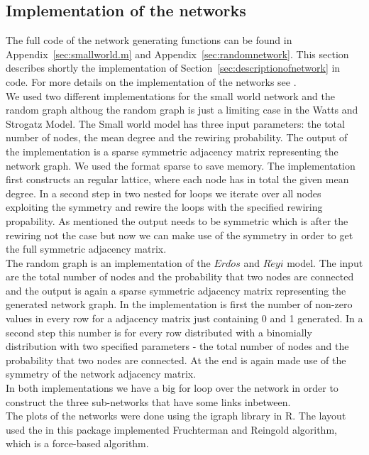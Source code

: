 \subsection{Implementation of the networks}
\label{sec:implementationofnetworks}

The full code of the network generating functions can be found in
Appendix~\ref{sec:smallworld.m} and Appendix~\ref{sec:randomnetwork}. This section describes shortly the implementation of Section~\ref{sec:descriptionofnetwork} in \matlab code. For more details on the implementation of the networks see \cite{BruggerSchwirzer2011}.\\

We used two different implementations for the small world network and the random graph althoug the random graph is just a limiting case in the Watts and Strogatz Model. The Small world model has three input parameters: the total number of nodes, the mean degree and the rewiring probability. The output of the implementation is a sparse symmetric adjacency matrix representing the network graph. We used the format sparse to save memory. The implementation first constructs an regular lattice, where each node has in total the given mean degree. In a second step in two nested for loops we iterate over all nodes exploiting the symmetry and rewire the loops with the specified rewiring propability. As mentioned the output needs to be symmetric which is after the rewiring not the case but now we can make use of the symmetry in order to get the full symmetric adjacency matrix.\\

The random graph is an implementation of the $Erd\acute{o}s$ and $R\acute{e}yi$ model. The input are the total number of nodes and the probability that two nodes are connected and the output is again a sparse symmetric adjacency matrix representing the generated network graph. In the implementation is first the number of non-zero values in every row for a adjacency matrix just containing 0 and 1 generated. In a second step this number is for every row distributed with a binomially distribution with two specified parameters - the total number of nodes and the probability that two nodes are connected. At the end is again made use of the symmetry of the network adjacency matrix. \\

In both implementations we have a big for loop over the network in order to construct the three sub-networks that have some links inbetween.\\

The plots of the networks were done using the igraph library in R. The layout used the in this package implemented Fruchterman and Reingold algorithm, which is a force-based algorithm.